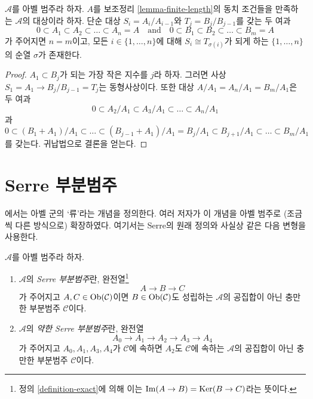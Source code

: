 \begin{lemma}
\label{lemma-jordan-holder}
$\mathcal{A}$를 아벨 범주라 하자. $A$를 보조정리
\ref{lemma-finite-length}의 동치 조건들을 만족하는 $\mathcal{A}$의
대상이라 하자. 단순 대상
$S_i = A_i/A_{i - 1}$와 $T_j = B_j/B_{j - 1}$를 갖는 두 여과
$$
0 \subset A_1 \subset A_2 \subset \ldots \subset A_n = A
\quad\text{and}\quad
0 \subset B_1 \subset B_2 \subset \ldots \subset B_m = A
$$
가 주어지면 $n = m$이고, 모든 $i \in \{1, \ldots, n\}$에 대해
$S_i \cong T_{\sigma(i)}$가 되게 하는 $\{1, \ldots, n\}$의 순열
$\sigma$가 존재한다.
\end{lemma}

\begin{proof}
$A_1 \subset B_j$가 되는 가장 작은 지수를 $j$라 하자.
그러면 사상 $S_1 = A_1 \to B_j/B_{j - 1} = T_j$는 동형사상이다.
또한 대상 $A/A_1 = A_n/A_1 = B_m/A_1$은 두 여과
$$
0 \subset A_2/A_1 \subset A_3/A_1 \subset \ldots \subset A_n/A_1
$$
과
$$
0 \subset (B_1 + A_1)/A_1 \subset \ldots \subset
(B_{j - 1} + A_1)/A_1 = B_j/A_1 \subset B_{j + 1}/A_1
\subset \ldots \subset B_m/A_1
$$
를 갖는다. 귀납법으로 결론을 얻는다.
\end{proof}









\section{Serre 부분범주}
\label{section-serre-subcategories}

\noindent
\cite[Chapter I, Section 1]{Serre_homotopie_classes}에서는 아벨 군의
‘류’라는 개념을 정의한다. 여러 저자가 이 개념을 아벨 범주로
(조금씩 다른 방식으로) 확장하였다. 여기서는 Serre의 원래 정의와
사실상 같은 다음 변형을 사용한다.

\begin{definition}
\label{definition-serre-subcategory}
\begin{reference}
\cite[Condition (I) on page 259]{Serre_homotopie_classes}
\end{reference}
$\mathcal{A}$를 아벨 범주라 하자.
\begin{enumerate}
\item $\mathcal{A}$의 {\it Serre 부분범주}란, 완전열\footnote{정의
\ref{definition-exact}에 의해 이는 $\mathop{\mathrm{Im}}(A \to B) = \mathop{\mathrm{Ker}}(B \to C)$라는
뜻이다.}
$$
A \to B \to C
$$
가 주어지고 $A, C \in \mathop{\mathrm{Ob}}\nolimits(\mathcal{C})$이면
$B \in \mathop{\mathrm{Ob}}\nolimits(\mathcal{C})$도 성립하는 $\mathcal{A}$의 공집합이 아닌
충만한 부분범주 $\mathcal{C}$이다.
\item $\mathcal{A}$의 {\it 약한 Serre 부분범주}란, 완전열
$$
A_0 \to A_1 \to A_2 \to A_3 \to A_4
$$
가 주어지고 $A_0, A_1, A_3, A_4$가 $\mathcal{C}$에 속하면
$A_2$도 $\mathcal{C}$에 속하는 $\mathcal{A}$의 공집합이 아닌
충만한 부분범주 $\mathcal{C}$이다.
\end{enumerate}
\end{definition}

